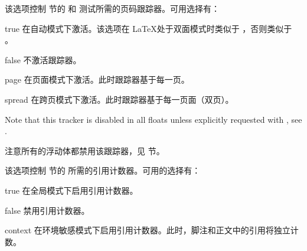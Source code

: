 \begin{optionlist}


该选项控制  节的   和  测试所需的页码跟踪器。可用选择有：

\begin{valuelist}
\item[true] %
在自动模式下激活。该选项在 \LaTeX 处于双面模式时类似于 ，否则类似于 。
\item[false] %
不激活跟踪器。
\item[page] %
在页面模式下激活。此时跟踪器基于每一页。
\item[spread] %
在跨页模式下激活。此时跟踪器基于每一页面（双页）。
\end{valuelist}


Note that this tracker is disabled in all floats unless explicitly requested with , see .

注意所有的浮动体都禁用该跟踪器，见  节。


该选项控制  节的  所需的引用计数器。可用的选择有：

\begin{valuelist}
\item[true] %
在全局模式下启用引用计数器。
\item[false] %
禁用引用计数器。
\item[context] %
在环境敏感模式下启用引用计数器。此时，脚注和正文中的引用将独立计数。
\end{valuelist}


\end{optionlist}
